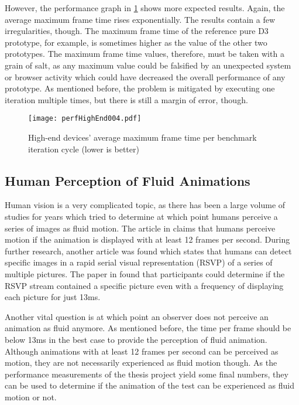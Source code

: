 However, the performance graph in \ref{fig:perfHighEnd004} shows more expected results. Again, the average maximum frame time rises exponentially. The results contain a few irregularities, though. The maximum frame time of the reference pure D3 prototype, for example, is sometimes higher as the value of the other two prototypes. The maximum frame time values, therefore, must be taken with a grain of salt, as any maximum value could be falsified by an unexpected system or browser activity which could have decreased the overall performance of any prototype. As mentioned before, the problem is mitigated by executing one iteration multiple times, but there is still a margin of error, though.

\begin{figure}
\centering
\texttt{[image: perfHighEnd004.pdf]}
\caption{High-end devices' average maximum frame time per benchmark iteration cycle (lower is better)}
\label{fig:perfHighEnd004}
\end{figure}

\subsection{Human Perception of Fluid Animations}
\label{sub:humanPerception}


Human vision is a very complicated topic, as there has been a large volume of studies for years which tried to determine at which point humans perceive a series of images as fluid motion. The article in \cite{RestorationOfMotionPictureFilm} claims that humans perceive motion if the animation is displayed with at least 12 frames per second. During further research, another article was found which states that humans can detect specific images in a rapid serial visual representation (RSVP) of a series of multiple pictures. The paper in \cite{Potter2014} found that participants could determine if the RSVP stream contained a specific picture even with a frequency of displaying each picture for just 13ms. 

Another vital question is at which point an observer does not perceive an animation as fluid anymore. As mentioned before, the time per frame should be below 13ms in the best case to provide the perception of fluid animation. Although animations with at least 12 frames per second can be perceived as motion, they are not necessarily experienced as fluid motion though. As the performance measurements of the thesis project yield some final numbers, they can be used to determine if the animation of the test can be experienced as fluid motion or not.

